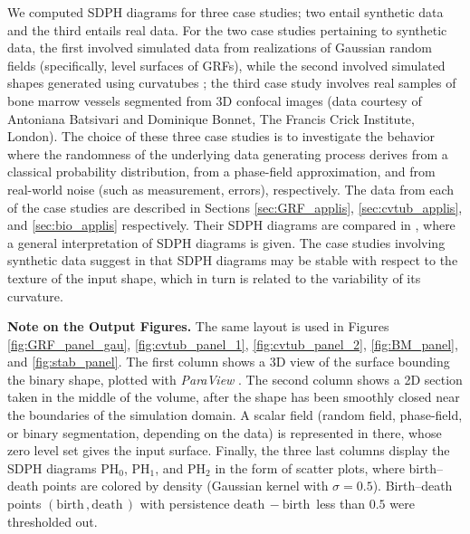 \documentclass[11pt]{article}
\newcommand{\PH}{\mathrm{PH}}
\newcommand{\birth}{\mathrm{birth} \,}
\newcommand{\death}{\mathrm{death} \,}
\theoremstyle{plain}
\theoremstyle{definition}
\theoremstyle{remark}
\begin{document}
	We computed SDPH diagrams for three case studies; two entail synthetic data and the third entails real data. 
	For the two case studies pertaining to synthetic data, the first involved simulated data from realizations of Gaussian random fields (specifically, level surfaces of GRFs), while the second involved simulated shapes generated using curvatubes \citep{song_generation_2022}; the third case study involves real samples of bone marrow vessels segmented from 3D confocal images (data courtesy of Antoniana Batsivari and Dominique Bonnet, The Francis Crick Institute, London).  The choice of these three case studies is to investigate the behavior where the randomness of the  underlying data generating process derives from a classical probability distribution, from a phase-field approximation, and from real-world noise (such as measurement, errors), respectively.  The data from each of the case studies are described in Sections \ref{sec:GRF_applis}, \ref{sec:cvtub_applis}, and \ref{sec:bio_applis} respectively. Their SDPH diagrams are compared in , where a general interpretation of SDPH diagrams is given. The case studies involving synthetic data suggest in  that SDPH diagrams may be stable with respect to the texture of the input shape, which in turn is related to the variability of its curvature.
	
	\textbf{Note on the Output Figures.}
	The same layout is used in Figures \ref{fig:GRF_panel_gau}, \ref{fig:cvtub_panel_1}, \ref{fig:cvtub_panel_2}, \ref{fig:BM_panel}, and \ref{fig:stab_panel}.
	The first column shows a 3D view of the surface bounding the binary shape, plotted with \textit{ParaView} \citep{ayachit_paraview_2015}. The second column shows a 2D section taken in the middle of the volume, after the shape has been smoothly closed near the boundaries of the simulation domain. A scalar field (random field, phase-field, or binary segmentation, depending on the data) is represented in there, whose zero level set gives the input surface. Finally, the three last columns display the SDPH diagrams $\PH_0$, $\PH_1$, and $\PH_2$ in the form of scatter plots, where birth--death points are colored by density (Gaussian kernel with $\sigma = 0.5$). Birth--death points $(\birth,\death)$ with persistence $\death - \birth$ less than $0.5$ were thresholded out.
	
\end{document}
